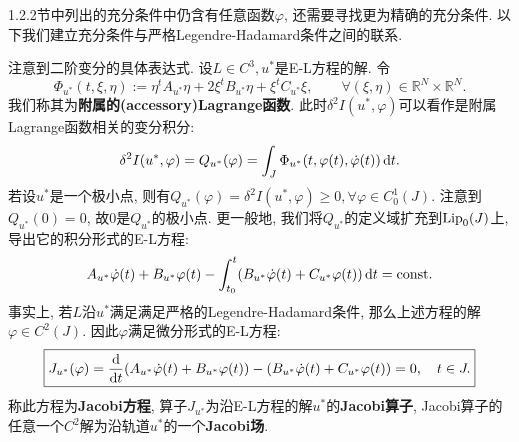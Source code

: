 1.2.2节中列出的充分条件中仍含有任意函数$\varphi$, 还需要寻找更为精确的充分条件.
以下我们建立充分条件与严格Legendre-Hadamard条件之间的联系.

注意到二阶变分的具体表达式. 设$L \in C^3, u^*$是E-L方程的解. 令 
\begin{equation*}
    \boxed{\Phi_{u^*}(t, \xi, \eta) := \eta^tA_{u^*}\eta+2\xi^tB_{u^*}\eta+\xi^tC_{u^*}\xi, \qquad \forall(\xi, \eta) \in \mathbb{R}^N \times \mathbb{R}^N.}
\end{equation*}
我们称其为\textbf{附属的(accessory)Lagrange函数}. 此时$\delta^2I(u^*, \varphi)$可以看作是附属Lagrange函数相关的变分积分:
\begin{equation*}
    \delta^2I(u^*, \varphi) = Q_{u^*}(\varphi)=\int_J\Phi_{u^*}(t, \varphi(t), \dot\varphi(t)) \,{\rm d}t.
\end{equation*}
若设$u^*$是一个极小点, 则有$Q_{u^*}(\varphi) = \delta^2I(u^*, \varphi) \geq 0, \forall\varphi \in C_0^1(J)$.
注意到$Q_{u^*}(0) = 0$, 故$0$是$Q_{u^*}$的极小点. 更一般地, 我们将$Q_{u^*}$的定义域扩充到${\rm Lip}_0(J)$上, 导出它的积分形式的E-L方程:
\begin{equation*}
    A_{u^*}\dot\varphi(t) + B_{u^*}\varphi(t) - \int_{t_0}^t(B_{u^*}\dot\varphi(t) + C_{u^*}\varphi(t)) \,{\rm d}t = {\rm const}. 
\end{equation*}
事实上, 若$L$沿$u^*$满足满足严格的Legendre-Hadamard条件, 那么上述方程的解$\varphi \in C^2(J)$.
因此$\varphi$满足微分形式的E-L方程:
\begin{equation*}
    \boxed{J_{u^*}(\varphi)= \frac{{\rm d}}{{\rm d}t}(A_{u^*}\dot\varphi(t) + B_{u^*}\varphi(t)) - (B_{u^*}\dot\varphi(t) + C_{u^*}\varphi(t)) = 0, \quad t \in J.}
\end{equation*}
称此方程为\textbf{Jacobi方程}, 算子$J_{u^*}$为沿E-L方程的解$u^*$的\textbf{Jacobi算子}, Jacobi算子的任意一个$C^2$解为沿轨道$u^*$的一个\textbf{Jacobi场}.


